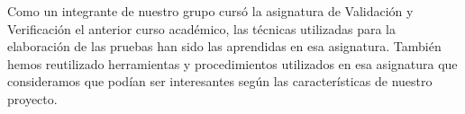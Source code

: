 Como un integrante de nuestro grupo cursó la asignatura de Validación y Verificación el anterior curso académico, las técnicas utilizadas para la elaboración de las pruebas han sido las aprendidas en esa asignatura. También hemos reutilizado herramientas y procedimientos utilizados en esa asignatura que consideramos que podían ser interesantes según las características de nuestro proyecto.